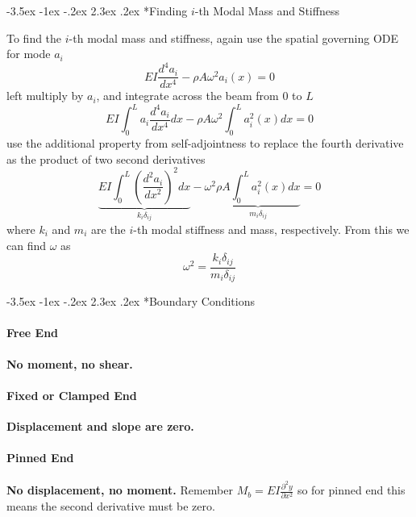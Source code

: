\documentclass[letterpaper,twocolumn,notitlepage]{article}
\makeatletter
\renewcommand\subsection{\@startsection{section}{1}{\z@}%
 {-3.5ex \@plus-1ex \@minus-.2ex}%
 {2.3ex \@plus.2ex}%
 {\fontsize{8pt}{8pt}\selectfont\sffamily}}
\makeatother
\begin{document}
  \subsection*{Finding $i$-th Modal Mass and Stiffness}

  To find the $i$-th modal mass and stiffness, again use the spatial governing ODE for mode $a_{i}$
  \begin{equation*}
    EI\frac{d^{4}a_{i}}{dx^{4}}-\rho A\omega^{2}a_{i}(x)=0
  \end{equation*}
  left multiply by $a_{i}$, and integrate across the beam from $0$ to $L$
  \begin{equation*}
    EI\int_{0}^{L}a_{i}\frac{d^{4}a_{i}}{dx^{4}}dx-\rho A\omega^{2}\int_{0}^{L}a_{i}^{2}(x)dx=0
  \end{equation*}
  use the additional property from self-adjointness to replace the fourth derivative as the product of two second derivatives
  \begin{equation*}
    \underbrace{EI\int_{0}^{L}\left(\frac{d^{2}a_{i}}{dx^{2}}\right)^{2}dx}_{k_{i}\delta_{ij}}-\omega^{2}\underbrace{\rho A\int_{0}^{L}a_{i}^{2}(x)dx}_{m_{i}\delta_{ij}}=0
  \end{equation*}
  where $k_{i}$ and $m_{i}$ are the $i$-th modal stiffness and mass, respectively.
  From this we can find $\omega$ as
  \begin{equation*}
    \omega^{2}=\frac{k_{i}\delta_{ij}}{m_{i}\delta_{ij}}
  \end{equation*}

  \subsection*{Boundary Conditions}

  \paragraph{Free End}
  \textbf{No moment, no shear.}

  \paragraph{Fixed or Clamped End}
  \textbf{Displacement and slope are zero.}

  \paragraph{Pinned End}
  \textbf{No displacement, no moment.} Remember $M_{b}=EI\frac{\partial^{2}y}{\partial x^{2}}$ so for pinned end this means the second derivative must be zero.
\end{document}
